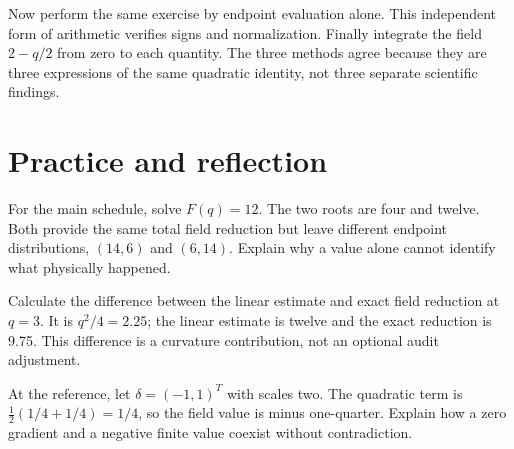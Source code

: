 Now perform the same exercise by endpoint evaluation alone. This independent form of arithmetic verifies signs and normalization. Finally integrate the field \(2-q/2\) from zero to each quantity. The three methods agree because they are three expressions of the same quadratic identity, not three separate scientific findings.

\section{Practice and reflection}
For the main schedule, solve \(F(q)=12\). The two roots are four and twelve. Both provide the same total field reduction but leave different endpoint distributions, \((14,6)\) and \((6,14)\). Explain why a value alone cannot identify what physically happened.

Calculate the difference between the linear estimate and exact field reduction at \(q=3\). It is \(q^2/4=2.25\); the linear estimate is twelve and the exact reduction is 9.75. This difference is a curvature contribution, not an optional audit adjustment.

At the reference, let \(\delta=(-1,1)^T\) with scales two. The quadratic term is \(\tfrac12(1/4+1/4)=1/4\), so the field value is minus one-quarter. Explain how a zero gradient and a negative finite value coexist without contradiction.
